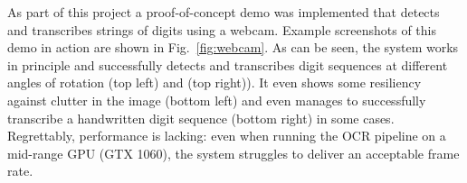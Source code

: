 \documentclass[12pt]{article}
\newcommand\figref[1]{Fig.~\ref{fig:#1}}
\begin{document}
As part of this project a proof-of-concept demo was implemented that detects and transcribes
strings of digits using a webcam. Example screenshots of this demo in action are shown in \figref{webcam}.
As can be seen, the system works in principle and successfully detects and transcribes digit sequences at
different angles of rotation (top left) and (top right)). It even
shows some resiliency against clutter in the image (bottom left) and even manages
to successfully transcribe a handwritten digit sequence (bottom right) in some cases.
Regrettably, performance is lacking: even when running the OCR pipeline on a mid-range GPU (GTX 1060),
the system struggles to deliver an acceptable frame rate.

\begin{figure}[ht]
    \centering
\end{figure}
\end{document}
